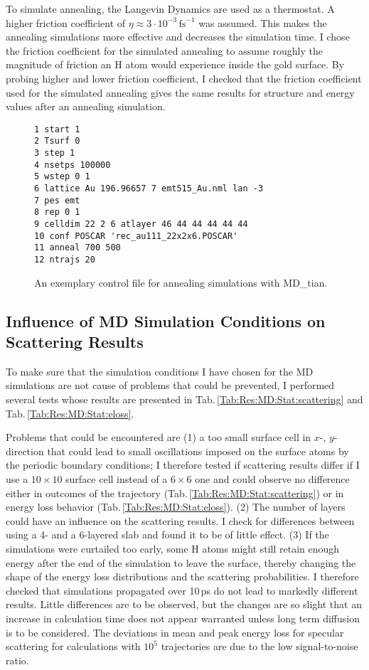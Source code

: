 \documentclass[twoside, 11pt, titlepage, captions=nooneline, a4paper, headsepline]{scrbook}%
\begin{document}
To simulate annealing, the Langevin Dynamics are used as a thermostat. A higher friction coefficient of $\eta \approx 3\cdot10^{-3}$\,$\mathrm{fs}^{-1}$ was assumed. This makes the annealing simulations more effective and decreases the simulation time. I chose the friction coefficient for the simulated annealing to assume roughly the magnitude of friction an H atom would experience inside the gold surface. By probing higher and lower friction coefficient, I checked that the friction coefficient used for the simulated annealing gives the same results for structure and energy values after an annealing simulation.

\begin{figure}[b!]
\begin{verbatim}
1 start 1
2 Tsurf 0
3 step 1
4 nsetps 100000
5 wstep 0 1
6 lattice Au 196.96657 7 emt515_Au.nml lan -3
7 pes emt
8 rep 0 1
9 celldim 22 2 6 atlayer 46 44 44 44 44 44
10 conf POSCAR 'rec_au111_22x2x6.POSCAR'
11 anneal 700 500
12 ntrajs 20
\end{verbatim}
\caption{\label{Fig:mxt:anneal}An exemplary control file for annealing simulations with MD\_tian.}
\end{figure}



\subsection{Influence of MD Simulation Conditions on Scattering Results}
To make sure that the simulation conditions I have chosen for the MD simulations are not cause of problems that could be prevented, I performed several tests whose results are presented in Tab.\,\ref{Tab:Res:MD:Stat:scattering} and Tab.\,\ref{Tab:Res:MD:Stat:eloss}.

Problems that could be encountered are (1) a too small surface cell in $x$-, $y$- direction that could lead to small oscillations imposed on the surface atoms by the periodic boundary conditions; I therefore tested if scattering results differ if I use a $10\times10$ surface cell instead of a $6\times6$ one and could observe no difference either in outcomes of the trajectory (Tab.\,\ref{Tab:Res:MD:Stat:scattering}) or in energy loss behavior (Tab.\,\ref{Tab:Res:MD:Stat:eloss}). (2) The number of layers could have an influence on the scattering results. I check for differences between using a 4- and a 6-layered slab and found it to be of little effect. (3) If the simulations were curtailed too early, some H atoms might still retain enough energy after the end of the simulation to leave the surface, thereby changing the shape of the energy loss distributions and the scattering probabilities. I therefore checked that simulations propagated over 10\,ps do not lead to markedly different results. Little differences are to be observed, but the changes are so slight that an increase in calculation time does not appear warranted unless long term diffusion is to be considered. 
The deviations in mean and peak energy loss for specular scattering for calculations with $10^5$ trajectories are due to the low signal-to-noise ratio.
\end{document}
